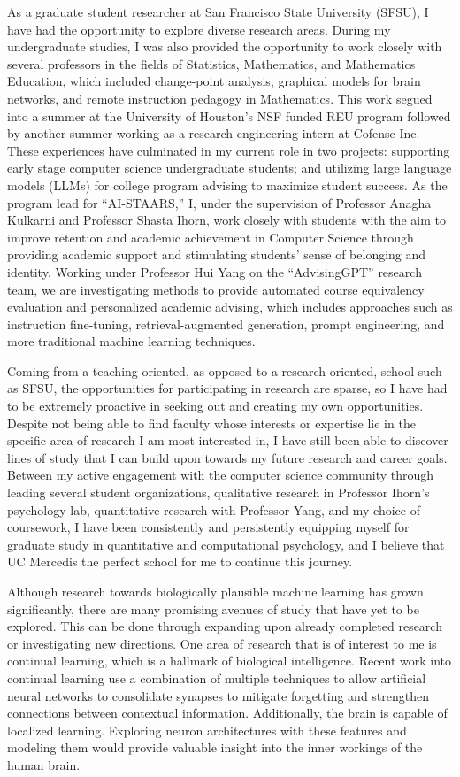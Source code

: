 \documentclass[12pt]{article}
\newcommand{\school}{UC Merced}
\begin{document}
As a graduate student researcher at San Francisco State University (SFSU), I have had the opportunity to explore diverse research areas.
During my undergraduate studies, I was also provided the opportunity to work closely with several professors in the fields of Statistics,
Mathematics, and Mathematics Education, which included change-point analysis, graphical models for brain networks, and remote instruction
pedagogy in Mathematics.  This work segued into a summer at the University of Houston's NSF funded REU program followed by another summer
working as a research engineering intern at Cofense Inc.  These experiences have culminated in my current role in two projects: supporting
early stage computer science undergraduate students; and utilizing large language models (LLMs) for college program advising to maximize
student success.  As the program lead for ``AI-STAARS,'' I, under the supervision of Professor Anagha Kulkarni and Professor Shasta Ihorn,
work closely with students with the aim to improve retention and academic achievement in Computer Science through providing academic support
and stimulating students' sense of belonging and identity.  Working under Professor Hui Yang on the ``AdvisingGPT'' research team, we are
investigating methods to provide automated course equivalency evaluation and personalized academic advising, which includes approaches such
as instruction fine-tuning, retrieval-augmented generation, prompt engineering, and more traditional machine learning techniques.

Coming from a teaching-oriented, as opposed to a research-oriented, school such as SFSU, the opportunities for participating in research are
sparse, so I have had to be extremely proactive in seeking out and creating my own opportunities.  Despite not being able to find faculty
whose interests or expertise lie in the specific area of research I am most interested in, I have still been able to discover lines of study
that I can build upon towards my future research and career goals.  Between my active engagement with the computer science community through
leading several student organizations, qualitative research in Professor Ihorn's psychology lab, quantitative research with Professor Yang,
and my choice of coursework, I have been consistently and persistently equipping myself for graduate study in quantitative and computational
psychology, and I believe that \school is the perfect school for me to continue this journey.

Although research towards biologically plausible machine learning has grown significantly, there are many promising avenues of study that
have yet to be explored.  This can be done through expanding upon already completed research or investigating new directions.  One
area of research that is of interest to me is continual learning, which is a hallmark of biological intelligence.  Recent work
into continual learning use a combination of multiple techniques to allow artificial neural networks to consolidate synapses to mitigate
forgetting and strengthen connections between contextual information.  Additionally, the brain is capable of localized learning.
Exploring neuron architectures with these features and modeling them would provide valuable insight into the inner workings of the
human brain.
\end{document}
